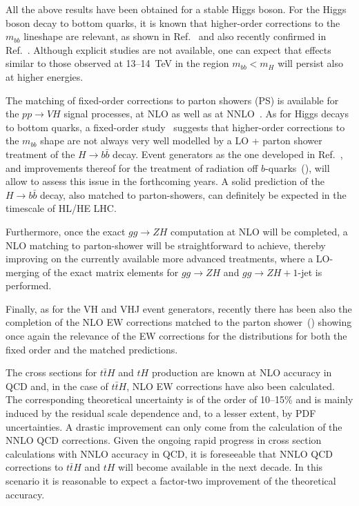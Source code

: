 All the above results have been obtained for a stable Higgs boson. For
the Higgs boson decay to bottom quarks, it is known that higher-order
corrections to the $m_{bb}$ lineshape are relevant, as shown in
Ref.~\cite{Ferrera:2017zex} and also recently confirmed
in Ref.~\cite{Caola:2017xuq}.  Although explicit studies are not available,
one can expect that effects similar to those observed at 13--14~TeV in
the region $m_{bb}<m_H$ will persist also at higher energies.

The matching of fixed-order corrections to parton showers (PS) is
available for the $pp\rightarrow VH$ signal processes, at NLO as well
as at NNLO~\cite{Astill:2016hpa,Astill:2018ivh}.
As for Higgs decays to bottom quarks, a fixed-order study~\cite{Caola:2017xuq}
suggests that higher-order corrections to the $m_{bb}$ shape are not always
very well modelled by a LO + parton shower treatment of the $H\to b\bar{b}$ decay.
Event generators as the one developed in Ref.~\cite{Astill:2018ivh}, and improvements thereof
for the treatment of radiation off $b$-quarks~(\cite{Buonocore:2017lry}),
will allow to assess this issue in the forthcoming
years. A solid prediction of the $H\to b\bar{b}$ decay, also matched to
parton-showers, can definitely be expected in the timescale of HL/HE LHC.

Furthermore, once the exact $gg\rightarrow ZH$ computation at NLO will
be completed, a NLO matching to parton-shower will be straightforward
to achieve, thereby improving on the currently available more advanced
treatments, where a LO-merging of the exact matrix elements for
$gg\rightarrow ZH$ and $gg\rightarrow ZH+1$-jet is performed.

Finally, as for the VH and VHJ event generators, recently there has been
also the completion of the NLO EW corrections matched to the parton
shower~(\cite{Granata:2017iod}) showing once again the relevance of the
EW corrections for the distributions for both the fixed order and the
matched predictions.

 

\label{sec:hl-lhc-ttH}
The cross sections for $t\bar t H$ and $tH$ production are known at NLO accuracy in QCD and, in the
case of $t \bar t H$, NLO EW corrections have also been calculated. The corresponding
theoretical uncertainty is of the order of 10--15\% and is mainly induced by the
residual scale dependence and, to a lesser extent, by PDF uncertainties. A
drastic improvement can only come from the calculation of the NNLO QCD
corrections. Given the ongoing rapid progress in cross section calculations with NNLO accuracy in QCD, it is
foreseeable that NNLO QCD corrections to $t\bar t H$ and $tH$ will become available in the
next decade. In this scenario it is reasonable to expect a factor-two
improvement of the theoretical accuracy.

